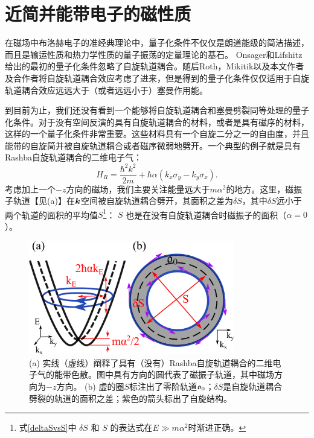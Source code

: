 \chapter{近简并能带电子的磁性质}

在磁场中布洛赫电子的准经典理论中，量子化条件不仅仅是朗道能级的简洁描述，而且是输运性质\cite{SdH}和热力学性质\cite{dHvA}的量子振荡的定量理论的基石。 Onsager\cite{Onsager}和Lifshitz\cite{lifshitz_kosevich,lifshitz_kosevich_jetp}给出的最初的量子化条件忽略了自旋轨道耦合。随后Roth\cite{rotheffham,rothmag}，Mikitik\cite{Mikitik_quantizationrule}以及本文作者及合作者\cite{topoferm,100p}将自旋轨道耦合效应考虑了进来，但是得到的量子化条件仅仅适用于自旋轨道耦合效应远远大于（或者远远小于）塞曼作用能。


到目前为止，我们还没有看到一个能够将自旋轨道耦合和塞曼劈裂同等处理的量子化条件。对于没有空间反演的具有自旋轨道耦合的材料，或者是具有磁序的材料，这样的一个量子化条件非常重要。这些材料具有一个自旋二分之一的自由度，并且能带的自旋简并被自旋轨道耦合或者磁序微弱地劈开。一个典型的例子就是具有Rashba自旋轨道耦合的二维电子气：
\begin{equation}
H_R=\frac{{\hbar^2} k^2}{2m}+\hbar\alpha  (k_{x}\sigma_{y}-k_{y}\sigma_{x}).\label{eq:Rashba-Hamiltonian}
\end{equation}
考虑加上一个$-z$方向的磁场，我们主要关注能量远大于$m\alpha^2$的地方。这里，磁振子轨道【见(a)】在$\boldsymbol{k}$空间被自旋轨道耦合劈开，其面积之差为$\delta S$，其中$\delta S$远小于两个轨道的面积的平均值$S$\footnote{式\ref{deltaSvsS}中 $\delta S$ 和 $S$ 的表达式在$E{\gg}m\alpha^2$时渐进正确。}：
$S$ 也是在没有自旋轨道耦合时磁振子的面积（$\alpha{=}0$）。

\begin{figure}
	\includegraphics[width=0.8\textwidth]{../figures/orbits.png}
	\centering
	\caption{(a) 实线（虚线）阐释了具有（没有）Rashba自旋轨道耦合的二维电子气的能带色散。图中具有方向的圆代表了磁振子轨道，其中磁场方向为$-z$方向。 (b) 虚的圈$S$标注出了零阶轨道$\mathfrak{o}_0$；$\delta S$是自旋轨道耦合劈裂的轨道的面积之差；紫色的箭头标出了自旋结构。\label{fig:orbits}}
\end{figure}


